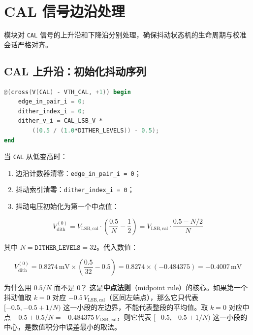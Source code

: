 \documentclass[UTF8,a4paper,11pt]{ctexart}
\newcommand{\Vlsb}{V_{\mathrm{LSB,cal}}}
\newcommand{\Vdith}{V_{\mathrm{dith}}}
\newcommand{\code}[1]{\texttt{#1}}
\begin{document}
\section{CAL 信号边沿处理}

模块对 \code{CAL} 信号的上升沿和下降沿分别处理，确保抖动状态机的生命周期与校准会话严格对齐。

\subsection{CAL 上升沿：初始化抖动序列}

\begin{lstlisting}[language=Verilog]
@(cross(V(CAL) - VTH_CAL, +1)) begin
    edge_in_pair_i = 0;
    dither_index_i = 0;
    dither_v_i = CAL_LSB_V *
        ((0.5 / (1.0*DITHER_LEVELS)) - 0.5);
end
\end{lstlisting}

当 \code{CAL} 从低变高时：

\begin{enumerate}[leftmargin=2em]
    \item 边沿计数器清零：\code{edge\_in\_pair\_i = 0}；
    \item 抖动索引清零：\code{dither\_index\_i = 0}；
    \item 抖动电压初始化为第一个中点值：
\end{enumerate}

\begin{equation}
\Vdith^{(0)} = \Vlsb \cdot \left(\frac{0.5}{N} - \frac{1}{2}\right) = \Vlsb \cdot \frac{0.5 - N/2}{N}
\label{eq:dither_init}
\end{equation}

其中 $N = \code{DITHER\_LEVELS} = 32$。代入数值：

\begin{equation}
\Vdith^{(0)} = 0.8274\,\mathrm{mV} \times \left(\frac{0.5}{32} - 0.5\right) = 0.8274 \times (-0.484375) = -0.4007\,\mathrm{mV}
\end{equation}

\begin{tipbox}{为什么用 $0.5/N$ 而不是 $0$？}
这是\textbf{中点法则}（midpoint rule）的核心。如果第一个抖动值取 $k=0$ 对应 $-0.5\,\Vlsb$（区间左端点），那么它只代表 $[-0.5, -0.5+1/N)$ 这一小段的左边界，不能代表整段的平均值。取 $k=0$ 对应中点 $-0.5 + 0.5/N = -0.484375\,\Vlsb$，则它代表 $[-0.5, -0.5+1/N)$ 这一小段的中心，是数值积分中误差最小的取法。
\end{tipbox}
\end{document}
